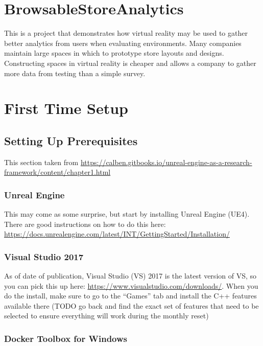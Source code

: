 \section{BrowsableStoreAnalytics}\label{browsablestoreanalytics}

This is a project that demonstrates how virtual reality may be used to
gather better analytics from users when evaluating environments. Many
companies maintain large spaces in which to prototype store layouts and
designs. Constructing spaces in virtual reality is cheaper and allows a
company to gather more data from testing than a simple survey.

\section{First Time Setup}\label{first-time-setup}

\subsection{Setting Up Prerequisites}\label{setting-up-prerequisites}

This section taken from
\url{https://calben.gitbooks.io/unreal-engine-as-a-research-framework/content/chapter1.html}

\subsubsection{Unreal Engine}\label{unreal-engine}

This may come as some surprise, but start by installing Unreal Engine
(UE4). There are good instructions on how to do this here:
\url{https://docs.unrealengine.com/latest/INT/GettingStarted/Installation/}

\subsubsection{Visual Studio 2017}\label{visual-studio-2017}

As of date of publication, Visual Studio (VS) 2017 is the latest version
of VS, so you can pick this up here:
\url{https://www.visualstudio.com/downloads/}. When you do the install,
make sure to go to the ``Games'' tab and install the C++ features
available there (TODO go back and find the exact set of features that
need to be selected to ensure everything will work during the monthly
reset)

\subsubsection{Docker Toolbox for
Windows}\label{docker-toolbox-for-windows}

